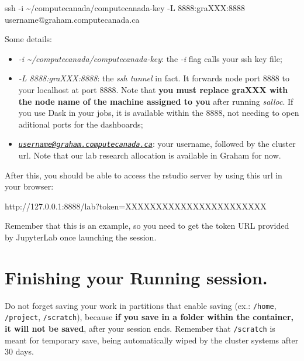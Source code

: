 \documentclass[
]{book}
\newenvironment{Shaded}{\begin{snugshade}}{\end{snugshade}}
\newcommand{\AttributeTok}[1]{\textcolor[rgb]{0.77,0.63,0.00}{#1}}
\newcommand{\ExtensionTok}[1]{#1}
\newcommand{\FunctionTok}[1]{\textcolor[rgb]{0.00,0.00,0.00}{#1}}
\newcommand{\NormalTok}[1]{#1}
\providecommand{\tightlist}{%
  \setlength{\itemsep}{0pt}\setlength{\parskip}{0pt}}
\begin{document}
\begin{Shaded}
\begin{Highlighting}[]
\FunctionTok{ssh} \AttributeTok{{-}i}\NormalTok{ \textasciitilde{}/computecanada/computecanada{-}key }\AttributeTok{{-}L}\NormalTok{ 8888:graXXX:8888 username@graham.computecanada.ca}
\end{Highlighting}
\end{Shaded}

Some details:

\begin{itemize}
\tightlist
\item
  \emph{-i \textasciitilde/computecanada/computecanada-key}: the \emph{-i} flag calls your ssh key file;
\item
  \emph{-L 8888:graXXX:8888}: the \emph{ssh tunnel} in fact. It forwards node port 8888 to your localhost at port 8888. Note that \textbf{you must replace graXXX with the node name of the machine assigned to you} after running \emph{salloc}. If you use Dask in your jobs, it is available within the 8888, not needing to open aditional ports for the dashboards;
\item
  \emph{\href{mailto:username@graham.computecanada.ca}{\nolinkurl{username@graham.computecanada.ca}}}: your username, followed by the cluster url. Note that our lab research allocation is available in Graham for now.
\end{itemize}

After this, you should be able to access the rstudio server by using this url
in your browser:

\begin{Shaded}
\begin{Highlighting}[]
\ExtensionTok{http://127.0.0.1:8888/lab?token=XXXXXXXXXXXXXXXXXXXXXXX}
\end{Highlighting}
\end{Shaded}

Remember that this is an example, so you need to get the token URL provided by JupyterLab once launching the session.

\hypertarget{finishing-your-running-session.-1}{%
\section{Finishing your Running session.}\label{finishing-your-running-session.-1}}

Do not forget saving your work in partitions that enable saving (ex.: \texttt{/home}, \texttt{/project}, \texttt{/scratch}), because \textbf{if you save in a folder within the container, it will not be saved}, after your session ends. Remember that \texttt{/scratch} is meant for temporary save, being automatically wiped by the cluster systems after 30 days.
\end{document}
